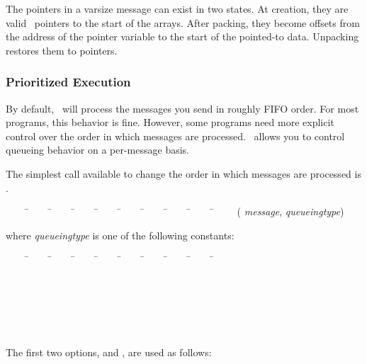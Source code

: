 The pointers in a varsize message can exist in two states.  
At creation, they are valid \CC\ pointers to the start of the arrays.  
After packing, they become offsets from the address of the pointer variable to 
the start of the pointed-to data.  Unpacking restores them to pointers. 


\subsubsection{Prioritized Execution}
\label{prioritized message passing}

By default, \charmpp\ will process the messages you send in roughly
FIFO order.  For most programs, this
behavior is fine.  However, some programs need more explicit control
over the order in which messages are processed.  \charmpp\ allows you
to control queueing behavior on a per-message basis.

The simplest call available to change the order in which messages
are processed is .

\begin{tabbing}
~~~~ \=~~~~ \=~~~~ \=~~~~ \=~~~~ \=~~~~ \=~~~~ \=~~~~ \=~~~~ \=~~~~ \kill
\> ( {\it message},  {\it
queueingtype}) \\
\end{tabbing}

where {\it queueingtype} is one of the following
constants:

\begin{tabbing}
~~~~ \=~~~~ \=~~~~ \=~~~~ \=~~~~ \=~~~~ \=~~~~ \=~~~~ \=~~~~ \=~~~~ \kill
\> \\
\> \\
\> \\
\> \\
\> \\
\> \\
\end{tabbing}

The first two options,   and
, are used as follows: 

